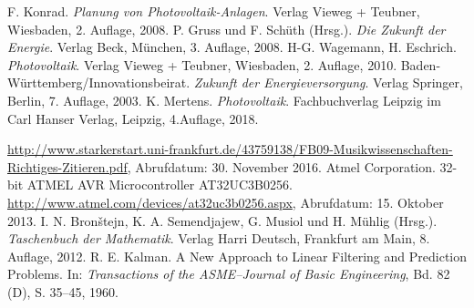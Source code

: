\begin{thebibliography}{99}
	 F. Konrad. {\itshape Planung von Photovoltaik-Anlagen}. Verlag Vieweg + Teubner, Wiesbaden, 2. Auflage, 2008.
	 P. Gruss und F. Schüth (Hrsg.). {\itshape Die Zukunft der Energie}. Verlag Beck, München, 3. Auflage, 2008.
	 H-G. Wagemann, H. Eschrich. {\itshape Photovoltaik}. Verlag Vieweg + Teubner, Wiesbaden, 2. Auflage, 2010.
	 Baden-Württemberg/Innovationsbeirat. {\itshape Zukunft der Energieversorgung}. Verlag Springer, Berlin, 7. Auflage, 2003.
	 K. Mertens. {\itshape Photovoltaik}. Fachbuchverlag Leipzig im Carl Hanser Verlag, Leipzig, 4.Auflage, 2018.
	
	 \url{http://www.starkerstart.uni-frankfurt.de/43759138/FB09-Musikwissenschaften-Richtiges-Zitieren.pdf}, Abrufdatum: 30. November 2016.
	 Atmel Corporation. 32-bit ATMEL AVR Microcontroller AT32UC3B0256. \url{http://www.atmel.com/devices/at32uc3b0256.aspx}, Abrufdatum: 15. Oktober 2013.
	 I. N. Bron\v{s}tejn, K. A. Semendjajew, G. Musiol und H. Mühlig (Hrsg.). {\itshape Taschenbuch der Mathematik}. Verlag Harri Deutsch, Frankfurt am Main, 8. Auflage, 2012.
	 R. E. Kalman. A New Approach to Linear Filtering and Prediction Problems. In: {\itshape Transactions of the ASME--Journal of Basic Engineering}, Bd. 82 (D), S. 35--45, 1960.
	
\end{thebibliography}